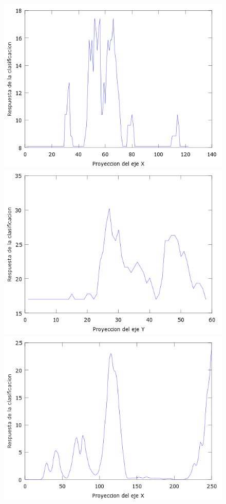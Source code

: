 \begin{figure}[H]
  \centering
  \includegraphics[scale=.4]{images/plots/boost3X}
  \includegraphics[scale=.4]{images/plots/boost3Y}
  \includegraphics[scale=.4]{images/plots/svm2X}

\end{figure}
